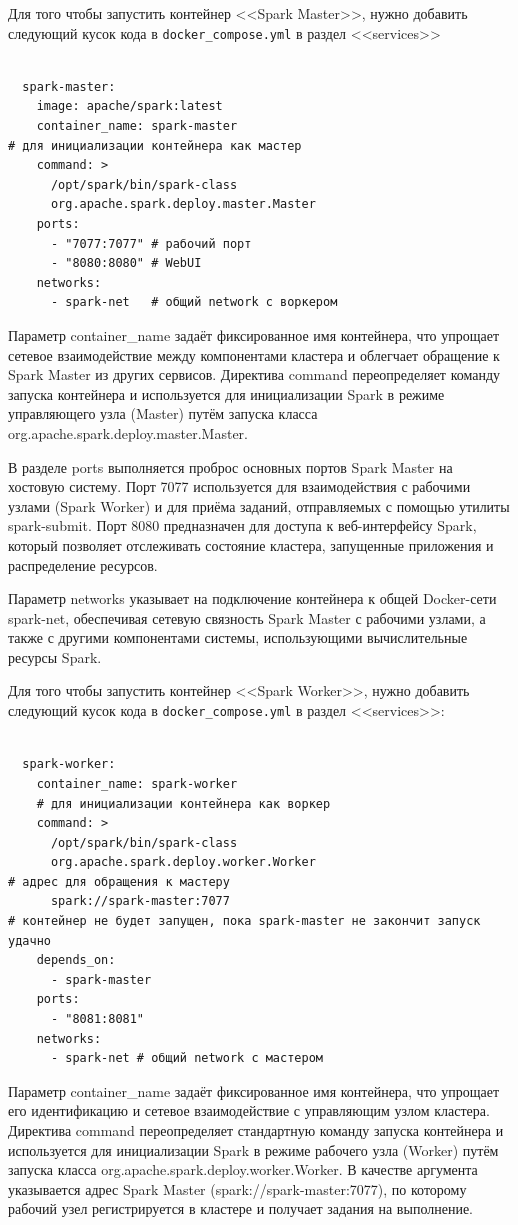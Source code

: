\documentclass[14pt,a4paper]{extarticle}
\begin{document}
Для того чтобы запустить контейнер <<Spark Master>>, нужно добавить следующий кусок кода в
\texttt{docker\_compose.yml} в раздел <<services>>

\begin{verbatim}

  spark-master:
    image: apache/spark:latest
    container_name: spark-master
# для инициализации контейнера как мастер
    command: >
      /opt/spark/bin/spark-class
      org.apache.spark.deploy.master.Master
    ports:
      - "7077:7077" # рабочий порт
      - "8080:8080" # WebUI
    networks:
      - spark-net   # общий network с воркером

\end{verbatim}

Параметр container\_name задаёт фиксированное имя контейнера, что упрощает
сетевое взаимодействие между компонентами кластера и облегчает обращение к
Spark Master из других сервисов. Директива command переопределяет команду
запуска контейнера и используется для инициализации Spark в режиме управляющего
узла (Master) путём запуска класса org.apache.spark.deploy.master.Master.

В разделе ports выполняется проброс основных портов Spark Master на хостовую
систему. Порт 7077 используется для взаимодействия с рабочими узлами (Spark
Worker) и для приёма заданий, отправляемых с помощью утилиты spark-submit. Порт
8080 предназначен для доступа к веб-интерфейсу Spark, который позволяет
отслеживать состояние кластера, запущенные приложения и распределение ресурсов.

Параметр networks указывает на подключение контейнера к общей Docker-сети
spark-net, обеспечивая сетевую связность Spark Master с рабочими узлами, а
также с другими компонентами системы, использующими вычислительные ресурсы
Spark.

Для того чтобы запустить контейнер <<Spark Worker>>, нужно добавить следующий кусок кода в
\texttt{docker\_compose.yml} в раздел <<services>>:

\begin{verbatim}

  spark-worker:
    container_name: spark-worker
    # для инициализации контейнера как воркер
    command: >
      /opt/spark/bin/spark-class
      org.apache.spark.deploy.worker.Worker
# адрес для обращения к мастеру
      spark://spark-master:7077
# контейнер не будет запущен, пока spark-master не закончит запуск удачно
    depends_on:
      - spark-master
    ports:
      - "8081:8081"
    networks:
      - spark-net # общий network с мастером

\end{verbatim}
Параметр container\_name задаёт фиксированное имя контейнера, что упрощает его
идентификацию и сетевое взаимодействие с управляющим узлом кластера. Директива
command переопределяет стандартную команду запуска контейнера и используется
для инициализации Spark в режиме рабочего узла (Worker) путём запуска класса
org.apache.spark.deploy.worker.Worker. В качестве аргумента указывается адрес
Spark Master (spark://spark-master:7077), по которому рабочий узел
регистрируется в кластере и получает задания на выполнение.
\end{document}
